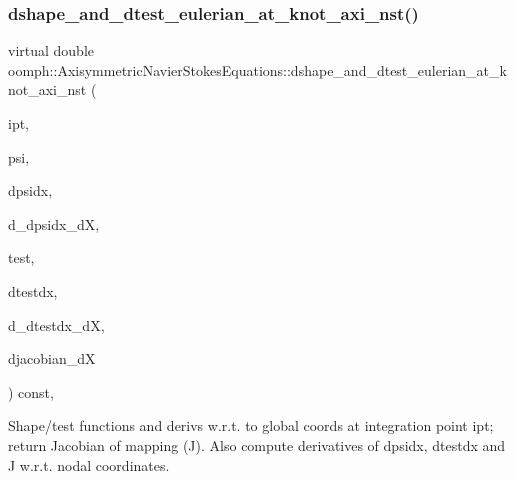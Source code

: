 \mbox{\label{classoomph_1_1AxisymmetricNavierStokesEquations_a2cd0715a679af81bd0e3d7448a5560cb}} 
\subsubsection{\texorpdfstring{dshape\+\_\+and\+\_\+dtest\+\_\+eulerian\+\_\+at\+\_\+knot\+\_\+axi\+\_\+nst()}{dshape\_and\_dtest\_eulerian\_at\_knot\_axi\_nst()}\hspace{0.1cm}{\footnotesize\ttfamily [2/2]}}
{\footnotesize\ttfamily virtual double oomph\+::\+Axisymmetric\+Navier\+Stokes\+Equations\+::dshape\+\_\+and\+\_\+dtest\+\_\+eulerian\+\_\+at\+\_\+knot\+\_\+axi\+\_\+nst (\begin{DoxyParamCaption}\item[{const unsigned \&}]{ipt,  }\item[{\hyperlink{classoomph_1_1Shape}{Shape} \&}]{psi,  }\item[{\hyperlink{classoomph_1_1DShape}{D\+Shape} \&}]{dpsidx,  }\item[{\hyperlink{classoomph_1_1RankFourTensor}{Rank\+Four\+Tensor}$<$ double $>$ \&}]{d\+\_\+dpsidx\+\_\+dX,  }\item[{\hyperlink{classoomph_1_1Shape}{Shape} \&}]{test,  }\item[{\hyperlink{classoomph_1_1DShape}{D\+Shape} \&}]{dtestdx,  }\item[{\hyperlink{classoomph_1_1RankFourTensor}{Rank\+Four\+Tensor}$<$ double $>$ \&}]{d\+\_\+dtestdx\+\_\+dX,  }\item[{\hyperlink{classoomph_1_1DenseMatrix}{Dense\+Matrix}$<$ double $>$ \&}]{djacobian\+\_\+dX }\end{DoxyParamCaption}) const\hspace{0.3cm}{\ttfamily [protected]}, {}}



Shape/test functions and derivs w.\+r.\+t. to global coords at integration point ipt; return Jacobian of mapping (J). Also compute derivatives of dpsidx, dtestdx and J w.\+r.\+t. nodal coordinates. 



